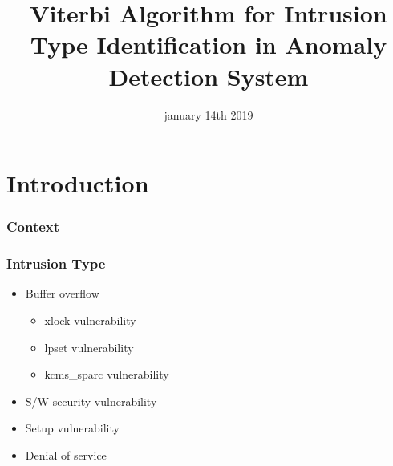 \documentclass{beamer}
\begin{document}
\title{Viterbi Algorithm for Intrusion Type Identification in Anomaly
  Detection System}
\author{ } 
\institute{ }
\date{january 14th 2019}

\maketitle

\section{Introduction}

\begin{frame}
\frametitle{Context}
\end{frame}

\begin{frame}
  \frametitle{Intrusion Type}
  \begin{itemize}[label=.]
  \item Buffer overflow
    \begin{itemize}[label=.]
    \item xlock vulnerability
    \item lpset vulnerability
    \item kcms\_sparc vulnerability
    \end{itemize}
  \item S/W security vulnerability
  \item Setup vulnerability
  \item Denial of service
  \end{itemize}
\end{frame}
\end{document}
